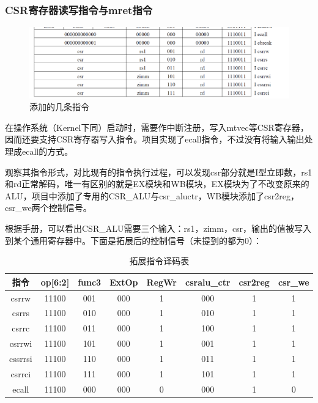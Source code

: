 \documentclass[]{article}
\begin{document}
  \subsubsection{CSR寄存器读写指令与mret指令}
    \begin{figure}[htb]
      \centering
      \includegraphics[width=\textwidth]{csr-instrs.png}
      \caption{添加的几条指令}
      \label{fig:csr-instrs}
  \end{figure}  
  在操作系统（Kernel下同）启动时，需要作中断注册，写入mtvec等CSR寄存器，因而还要支持CSR寄存器写入指令。项目实现了ecall指令，不过没有将输入输出处理成ecall的方式。
  
  观察其指令形式，对比现有的指令执行过程，可以发现csr部分就是I型立即数，rs1和rd正常解码，唯一有区别的就是EX模块和WB模块，EX模块为了不改变原来的ALU，项目中添加了专用的CSR\_ALU与csr\_aluctr，WB模块添加了csr2reg，csr\_we两个控制信号。
  
  根据手册，可以看出CSR\_ALU需要三个输入：rs1，zimm，csr，输出的值被写入到某个通用寄存器中。下面是拓展后的控制信号（未提到的都为0）：
  \begin{table}[h!]
      \centering
      \begin{tabular}{c|c|c|c|c|c|c|c}
         \hline
           指令 & op[6:2] & func3 & ExtOp & RegWr & csralu\_ctr & csr2reg & csr\_we  \\
         \hline
        csrrw & 11100 & 001 & 000 & 1 & 000 & 1 & 1 \\
        csrrs & 11100 & 010 & 000 & 1 & 010 & 1 & 1 \\
        csrrc & 11100 & 011 & 000 & 1 & 100 & 1 & 1 \\
        csrrwi & 11100 & 101 & 000 & 1 & 001 & 1 & 1 \\
        cssrrsi & 11100 & 110 & 000 & 1 & 011 & 1 & 1 \\
        csrrci & 11100 & 111 & 000 & 1 & 101 & 1 & 1 \\
        ecall & 11100 & 000 & 000 & 0 & 000 & 1 & 0  \\
        \hline
      \end{tabular}
      \caption{拓展指令译码表}
      \label{tab:csrinstrs}
  \end{table}
  
\end{document}
